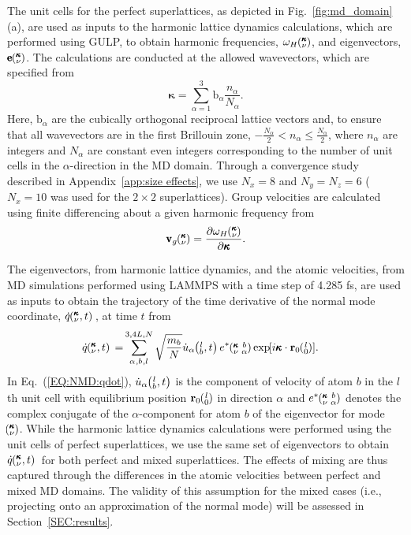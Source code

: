 \documentclass[aps,prb,preprint,preprintnumbers,amsmath,amssymb,floatfix,superscriptaddress]{revtex4}
\newcommand{\EXP}[1]{\exp\mspace{-5.0mu}\left[#1\right]\mspace{-3.0mu}}
\newcommand{\SUM}[2]{\ifthenelse{\equal{#1}{0}}{\sum_{
\alpha_{#2},b_{#2},l_{#2}}^{3,4L,N}} {\ifthenelse{\equal{#1}{1}}{\sum_{
\alpha_{#2},b_{#2}}^{3,n}}{\sum_{\pmb{\kappa}#2,\nu#2}^{N,3n}}}}
\newcommand{\ab}[2]{\mspace{-4.0mu}\left(\mspace{-8.0mu}
\begin{smallmatrix}&\ifthenelse{\equal{#1}{}}{a}{#1} \\&\ifthenelse
{\equal{#2}{}}{b}{#2}\end{smallmatrix}\mspace{-3.0mu}\right)}
\newcommand{\kvba}{\mspace{-4.0mu}\left(\mspace{-8.0mu}
\begin{smallmatrix} &\pmb{\kappa} &b \\ &\nu &\alpha\end{smallmatrix}
\mspace{-3.0mu}\right)}
\newcommand{\kvt}{\mspace{-4.0mu}\left(\mspace{-8.0mu}
\begin{smallmatrix}&\pmb{\kappa} \\&\nu\end{smallmatrix}
\mspace{-2.0mu},t\right)}
\newcommand{\kv}{\mspace{-4.0mu}\left(\mspace{-8.0mu}
\begin{smallmatrix}&\pmb{\kappa} \\&\nu\end{smallmatrix}
\mspace{-3.0mu}\right)}
\newcommand{\lbt}{\mspace{-4.0mu}\left(\mspace{-8.0mu}
\begin{smallmatrix}&l \\&b\end{smallmatrix}\mspace{-2.0mu},t\right)}
\begin{document}
The unit cells for the perfect superlattices, as depicted in Fig.~\ref{fig:md_domain}(a), are used as inputs to the harmonic lattice dynamics calculations, which are performed using GULP,\cite{GULP} to obtain harmonic frequencies, $\omega_H \kv$, and eigenvectors, $ \pmb{\mathrm{e}} \kv$. The calculations are conducted at the allowed wavevectors, which are specified from
\begin{equation}\label{EQ:NMD:allowdkpt}
\pmb{\kappa} = \sum_{\alpha=1}^3 \pmb{\mathrm{b}}_{\alpha} \frac{n_{\alpha}}{N_{\alpha}}.
\end{equation}
Here, $\pmb{\mathrm{b}}_\alpha$ are the cubically orthogonal reciprocal lattice vectors and, to ensure that all wavevectors are in the first Brillouin zone, $ -\frac{N_\alpha}{2} < n_\alpha \le \frac {N_\alpha}{2}$, where $n_\alpha$ are integers and $N_\alpha$ are constant even integers corresponding to the number of unit cells in the $\alpha$-direction in the MD domain. Through a convergence study described in Appendix~\ref{app:size effects}, we use $N_x=8$ and $N_y=N_z=6$ ($N_x=10$ was used for the $2\times2$ superlattices). Group velocities are calculated using finite differencing about a given harmonic frequency from \cite{ziman_electrons_2001}
\begin{equation}\label{EQ:NMD:vg}
\begin{split}
\pmb{\mathrm{v}}_{g}\kv=\frac{\partial \omega_H \kv}{\partial \pmb{\kappa}}.
\end{split}
\end{equation}

The eigenvectors, from harmonic lattice dynamics, and the atomic velocities, from MD simulations performed using LAMMPS with a time step of 4.285 fs,\cite{LAMMPS} are used as inputs to obtain the trajectory of the time derivative of the normal mode coordinate, $\dot{q}\kvt{}{}{}$, at time $t$ from
\begin{equation}\label{EQ:NMD:qdot}
\begin{split}
\dot{q}\kvt{}{}{}=&\SUM{0}{}\sqrt{\frac{m_b}{N}}\dot{u}_{\alpha}\lbt e^*\kvba\EXP{i\pmb{\kappa}\cdot\mathbf{r}_0\ab{l}{0}}.
\end{split}
\end{equation}
In Eq.~(\ref{EQ:NMD:qdot}), $\dot{u}_{\alpha}\lbt$ is the component of velocity of atom $b$ in the $l$th unit cell with equilibrium position $\mathbf{r}_0\ab{l}{0}$ in direction $\alpha$ and $e^*\kvba$ denotes the complex conjugate of the $\alpha$-component for atom $b$ of the eigenvector for mode  ~$\kv$. While the harmonic lattice dynamics calculations were performed using the unit cells of perfect superlattices, we use the same set of eigenvectors to obtain $\dot{q}\kvt{}{}{}$ for both perfect and mixed superlattices. The effects of mixing are thus captured through the differences in the atomic velocities between perfect and mixed MD domains. The validity of this assumption for the mixed cases (i.e., projecting onto an approximation of the normal mode) will be assessed in Section~\ref{SEC:results}.
\end{document}
